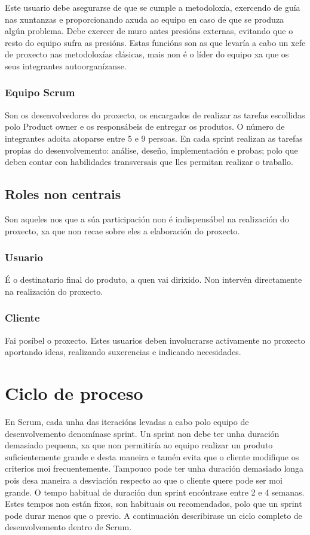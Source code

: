 Este usuario debe asegurarse de que se cumple a metodoloxía, exercendo de guía nas xuntanzas e proporcionando axuda ao equipo en caso de que se produza algún problema. Debe exercer de muro antes presións externas, evitando que o resto do equipo sufra as presións. Estas funcións son as que levaría a cabo un xefe de proxecto nas metodoloxías clásicas, mais non é o líder do equipo xa que os seus integrantes autoorganízanse.

\subsubsection{Equipo Scrum}

Son os desenvolvedores do proxecto, os encargados de realizar as tarefas escollidas polo Product owner e os responsábeis de entregar os produtos. O número de integrantes adoita atoparse entre 5 e 9 persoas. En cada sprint realizan as tarefas propias do desenvolvemento: análise, deseño, implementación e probas; polo que deben contar con habilidades transversais que lles permitan realizar o traballo.

\subsection{Roles non centrais}

Son aqueles nos que a súa participación non é indispensábel na realización do proxecto, xa que non recae sobre eles a elaboración do proxecto.

\subsubsection{Usuario}

É o destinatario final do produto, a quen vai dirixido. Non intervén directamente na realización do proxecto.

\subsubsection{Cliente}

Fai posíbel o proxecto. Estes usuarios deben involucrarse activamente no proxecto aportando ideas, realizando suxerencias e indicando necesidades.


\section{Ciclo de proceso}

En Scrum, cada unha das iteracións levadas a cabo polo equipo de desenvolvemento denomínase sprint. Un sprint non debe ter unha duración demasiado pequena, xa que non permitiría ao equipo realizar un produto suficientemente grande e desta maneira e tamén evita que o cliente modifique os criterios moi frecuentemente. Tampouco pode ter unha duración demasiado longa pois desa maneira a desviación respecto ao que o cliente quere pode ser moi grande. O tempo habitual de duración dun sprint encóntrase entre 2 e 4 semanas. Estes tempos non están fixos, son habituais ou recomendados, polo que un sprint pode durar menos que o previo.
A continuación describirase un ciclo completo de desenvolvemento dentro de Scrum.

